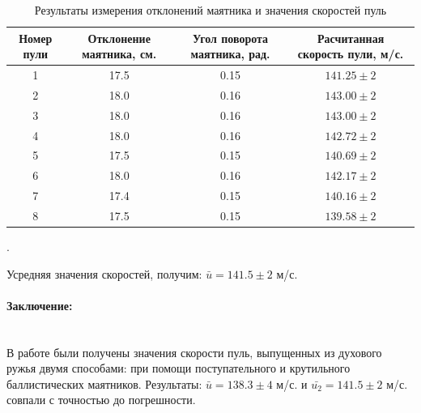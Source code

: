 \documentclass[a4paper, 12pt]{article}
\newcommand{\parag}[1]{\paragraph*{#1:}}
\newcounter{Points}
\newcommand{\point}{\arabic{Points}. \addtocounter{Points}{1}}
\begin{document}
\begin{table}[!h]
    \centering
    \begin{tabular}{|c|c|c|c|}
        \hline
        Номер пули & Отклонение маятника, см. & Угол поворота маятника, рад. & Расчитанная скорость пули, м/с. \\ \hline
        1 &	17.5	&	0.15	&	$141.25 \pm 2$ \\ \hline
        2 &	18.0	&	0.16	&	$143.00 \pm 2$ \\ \hline
        3 &	18.0	&	0.16	&	$143.00 \pm 2$ \\ \hline
        4 &	18.0	&	0.16	&	$142.72 \pm 2$ \\ \hline
        5 &	17.5	&	0.15	&	$140.69 \pm 2$ \\ \hline
        6 &	18.0	&	0.16	&	$142.17 \pm 2$ \\ \hline
        7 &	17.4	&	0.15	&	$140.16 \pm 2$ \\ \hline
        8 &	17.5	&	0.15	&	$139.58 \pm 2$ \\ \hline

    \end{tabular}
    \caption{Результаты измерения отклонений маятника и значения скоростей пуль}
    \label{tabl:results_2}
\end{table}

\point Усредняя значения скоростей, получим: $\bar{u} = 141.5 \pm 2$ м/с.

\parag {Заключение} ~\\
В работе были получены значения скорости пуль, выпущенных из духового ружья двумя способами: при помощи поступательного и крутильного баллистических маятников. Результаты: $\bar{u} = 138.3 \pm 4$ м/с. и $\bar{u_2} = 141.5 \pm 2$ м/с. совпали с точностью до погрешности. 
\end{document}
